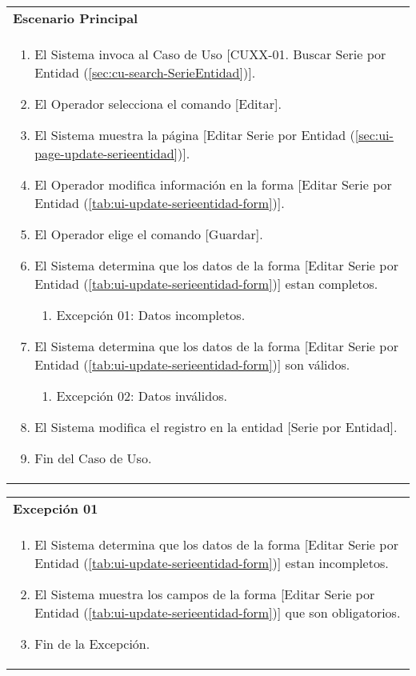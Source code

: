 \begin{tabular}{ p{15.5cm} }
	\textbf{Escenario Principal} \\
	\begin{enumerate}
		\item El Sistema invoca al Caso de Uso [CUXX-01. Buscar Serie por Entidad (\ref{sec:cu-search-SerieEntidad})].
		\item El Operador selecciona el comando [Editar].
		\item El Sistema muestra la página [Editar Serie por Entidad (\ref{sec:ui-page-update-serieentidad})].
		\item El Operador modifica información en la forma [Editar Serie por Entidad (\ref{tab:ui-update-serieentidad-form})].
		\item El Operador elige el comando [Guardar].
		\item El Sistema determina que los datos de la forma [Editar Serie por Entidad (\ref{tab:ui-update-serieentidad-form})] estan completos.
			\begin{enumerate}
				\item Excepción 01: Datos incompletos.
			\end{enumerate}
		\item El Sistema determina que los datos de la forma [Editar Serie por Entidad (\ref{tab:ui-update-serieentidad-form})] son válidos.
			\begin{enumerate}
				\item Excepción 02: Datos inválidos.
			\end{enumerate}
		\item El Sistema modifica el registro en la entidad [Serie por Entidad].
		\item Fin del Caso de Uso.
	\end{enumerate}
\end{tabular}

\begin{tabular}{ p{15.5cm} }
	\textbf{Excepción 01} \\
	\begin{enumerate}
		\item El Sistema determina que los datos de la forma [Editar Serie por Entidad (\ref{tab:ui-update-serieentidad-form})] estan incompletos.
		\item El Sistema muestra los campos de la forma [Editar Serie por Entidad (\ref{tab:ui-update-serieentidad-form})] que son obligatorios.
		\item Fin de la Excepción.
	\end{enumerate}
\end{tabular}

